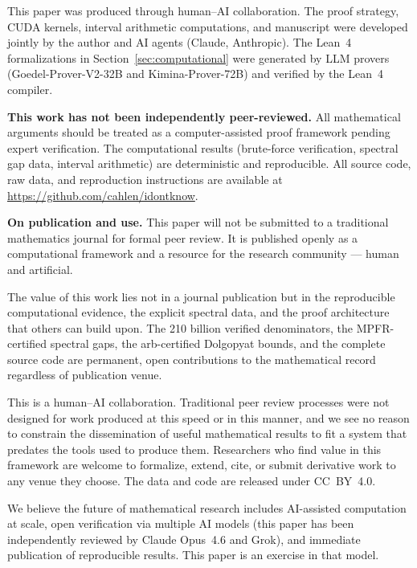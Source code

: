 \documentclass[11pt,a4paper]{amsart}
\theoremstyle{definition}
\begin{document}
This paper was produced through human--AI collaboration. The proof strategy, CUDA kernels, interval arithmetic computations, and manuscript were developed jointly by the author and AI agents (Claude, Anthropic). The Lean~4 formalizations in Section~\ref{sec:computational} were generated by LLM provers (Goedel-Prover-V2-32B and Kimina-Prover-72B) and verified by the Lean~4 compiler.

\medskip\noindent
\textbf{This work has not been independently peer-reviewed.} All mathematical arguments should be treated as a computer-assisted proof framework pending expert verification. The computational results (brute-force verification, spectral gap data, interval arithmetic) are deterministic and reproducible. All source code, raw data, and reproduction instructions are available at \url{https://github.com/cahlen/idontknow}.

\medskip\noindent
\textbf{On publication and use.} This paper will not be submitted to a traditional mathematics journal for formal peer review. It is published openly as a computational framework and a resource for the research community --- human and artificial.

The value of this work lies not in a journal publication but in the reproducible computational evidence, the explicit spectral data, and the proof architecture that others can build upon. The 210 billion verified denominators, the MPFR-certified spectral gaps, the arb-certified Dolgopyat bounds, and the complete source code are permanent, open contributions to the mathematical record regardless of publication venue.

This is a human--AI collaboration. Traditional peer review processes were not designed for work produced at this speed or in this manner, and we see no reason to constrain the dissemination of useful mathematical results to fit a system that predates the tools used to produce them. Researchers who find value in this framework are welcome to formalize, extend, cite, or submit derivative work to any venue they choose. The data and code are released under CC~BY~4.0.

We believe the future of mathematical research includes AI-assisted computation at scale, open verification via multiple AI models (this paper has been independently reviewed by Claude Opus~4.6 and Grok), and immediate publication of reproducible results. This paper is an exercise in that model.
\end{document}
